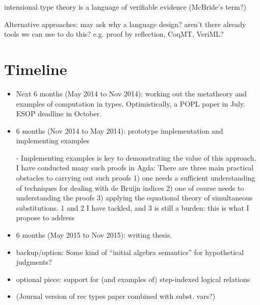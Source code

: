 \documentclass{article}
\begin{document}
intensional type theory is a language of verifiable evidence
(McBride's term?)

Alternative approaches: may ask why a language design? aren't there
already tools we can use to do this? e.g. proof by reflection, CoqMT, VeriML?
\section{Timeline}
\begin{itemize}
\item Next 6 months (May 2014 to Nov 2014): working out the metatheory and examples of computation in
types. Optimistically, a POPL paper in July. ESOP deadline in October. 
\item 6 months (Nov 2014 to May 2014): prototype implementation and implementing examples

 - Implementing examples is key to demonstrating the value of this
 approach. I have conducted many such proofs in Agda: There are three
 main practical obstacles to carrying out such proofs 1) one needs a
 sufficient understanding of techniques for dealing with de Bruijn
 indices 2) one of course needs to understanding the proofs 3)
 applying the equational theory of simultaneous substitutions. 1 and 2
 I have tackled, and 3 is still a burden: this is what I propose to address
\item 6 months (May 2015 to Nov 2015): writing thesis.
\item backup/option: Some kind of ``initial algebra semantics'' for hypothetical judgments?
\item optional piece: support for (and examples of) step-indexed
  logical relations
\item (Journal version of rec types paper combined with subst. vars?)
\end{itemize}



\end{document}
